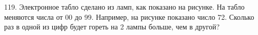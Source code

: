 119. Электронное табло сделано из ламп, как показано на рисунке. На табло меняются числа от 00 до 99. Например, на рисунке показано число 72. Сколько раз в одной из цифр будет гореть на 2 лампы больше, чем в другой?
\begin{center}
\begin{figure}[ht!]
\end{figure}
\end{center}
